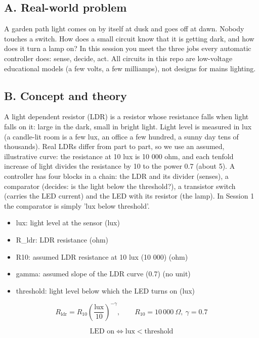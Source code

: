 \documentclass[11pt,a4paper]{article}
\begin{document}
\subsection*{A. Real-world problem}
A garden path light comes on by itself at dusk and goes off at dawn. Nobody touches a switch. How does a small circuit know that it is getting dark, and how does it turn a lamp on? In this session you meet the three jobs every automatic controller does: sense, decide, act. All circuits in this repo are low-voltage educational models (a few volts, a few milliamps), not designs for mains lighting.

\subsection*{B. Concept and theory}
A light dependent resistor (LDR) is a resistor whose resistance falls when light falls on it: large in the dark, small in bright light. Light level is measured in lux (a candle-lit room is a few lux, an office a few hundred, a sunny day tens of thousands). Real LDRs differ from part to part, so we use an assumed, illustrative curve: the resistance at 10 lux is 10 000 ohm, and each tenfold increase of light divides the resistance by 10 to the power 0.7 (about 5). A controller has four blocks in a chain: the LDR and its divider (senses), a comparator (decides: is the light below the threshold?), a transistor switch (carries the LED current) and the LED with its resistor (the lamp). In Session 1 the comparator is simply 'lux below threshold'.

\begin{itemize}[nosep]
\item lux: light level at the sensor (lux)
\item R\_ldr: LDR resistance (ohm)
\item R10: assumed LDR resistance at 10 lux (10 000) (ohm)
\item gamma: assumed slope of the LDR curve (0.7) (no unit)
\item threshold: light level below which the LED turns on (lux)
\end{itemize}

\begin{equation*}
R_{\mathrm{ldr}}=R_{10}\left(\frac{\text{lux}}{10}\right)^{-\gamma},\qquad R_{10}=10\,000\ \Omega,\ \gamma=0.7
\end{equation*}

\begin{equation*}
\text{LED on}\iff \text{lux}<\text{threshold}
\end{equation*}
\end{document}
